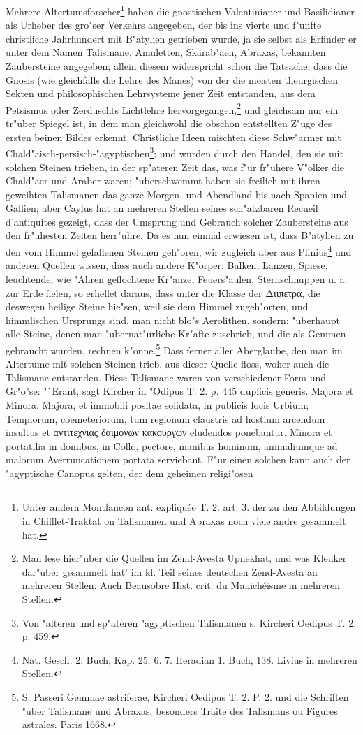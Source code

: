 \documentclass[a4paper, 11pt, oneside, polutonikogreek, german]{article}
\begin{document}
Mehrere Altertumsforscher\footnote{Unter andern Montfancon ant. expliquée T. 2. art. 3. der zu den Abbildungen in Chifflet-Traktat on Talismanen und Abraxas noch viele andre gesammelt hat.} haben die gnostischen Valentinianer und Basilidianer als Urheber des gro"ser Verkehrs angegeben, der bis ins vierte und f"unfte christliche Jahrhundert mit B"atylien getrieben wurde, ja sie selbst als Erfinder er unter dem Namen Talismane, Amuletten, Skarab"aen, Abraxas, bekannten Zaubersteine angegeben; allein diesem widerspricht schon die Tatsache; dass die Gnosis (wie gleichfalls die Lehre des Manes) von der die meisten theurgischen Sekten und philosophischen Lehrsysteme jener Zeit entstanden, aus dem Petsismus oder Zerduschts Lichtlehre hervorgegangen,\footnote{Man lese hier"uber die Quellen im Zend-Avesta Upnekhat, und was Kleuker dar"uber gesammelt hat' im kl. Teil seines deutschen Zend-Avesta an mehreren Stellen. Auch Beausobre Hist. crit. du Manichéisme in mehreren Stellen.} und gleichsam nur ein tr"uber Spiegel ist, in dem man gleichwohl die obschon entstellten Z"uge des ersten beinen Bildes erkennt. Christliche Ideen mischten diese Schw"armer mit Chald"aisch-persisch-"agyptischen\footnote{Von "alteren und sp"ateren "agyptischen Talismanen s. Kircheri Oedipus T. 2. p. 459.}; und wurden durch den Handel, den sie mit solchen Steinen trieben, in der sp"ateren Zeit das, was f"ur fr"uhere V"olker die Chald"aer und Araber waren; "uberschwemmt haben sie freilich mit ihren geweihten Talismanen das ganze Morgen- und Abendland bis nach Spanien und Gallien; aber Caylus hat an mehreren Stellen seines sch"atzbaren Recueil d'antiquites gezeigt, dass der Umsprung und Gebrauch solcher Zaubersteine aus den fr"uhesten Zeiten herr"uhre. Da es nun einmal erwiesen ist, dass B"atylien zu den vom Himmel gefallenen Steinen geh"oren, wir zugleich aber aus Plinius\footnote{Nat. Gesch. 2. Buch, Kap. 25. 6. 7. Heradian 1. Buch, 138. Livius in mehreren Stellen.} und anderen Quellen wissen, dass auch andere K"orper: Balken, Lanzen, Spiese, leuchtende, wie "Ahren geflochtene Kr"anze, Feuers"aulen, Sternschnuppen u. a. zur Erde fielen, so erhellet daraus, dass unter die Klasse der Διιπετρα, die deswegen heilige Steine hie"sen, weil sie dem Himmel zugeh"orten, und himmlischen Ursprungs sind, man nicht blo"s Aerolithen, sondern: "uberhaupt alle Steine, denen man "ubernat"urliche Kr"afte zuschrieb, und die als Gemmen gebraucht wurden, rechnen k"onne.\footnote{S. Passeri Gemmae astriferae, Kircheri Oedipus T. 2. P. 2. und die Schriften "uber Talismane und Abraxas, besonders Traite des Talismans ou Figures astrales. Paris 1668.} Dass ferner aller Aberglaube, den man im Altertume mit solchen Steinen trieb, aus dieser Quelle floss, woher auch die Talismane entstanden. Diese Talismane waren von verschiedener Form und Gr"o"se: "`Erant, sagt Kircher in "Odipus T. 2. p. 445 duplicis generis. Majora et Minora. Majora, et immobili positae solidata, in publicis locis Urbium; Templorum, coemeteriorum, tum regionum claustris ad hostium arcendum insultus et αντιτεχνιας δαιμονων κακουργων eludendos ponebantur. Minora et portatilia in domibus, in Collo, pectore, manibus hominum, animaliumque ad malorum Averruncationem portata serviebant. F"ur einen solchen kann auch der "agyptische Canopus gelten, der dem geheimen religi"osen 
\end{document}
